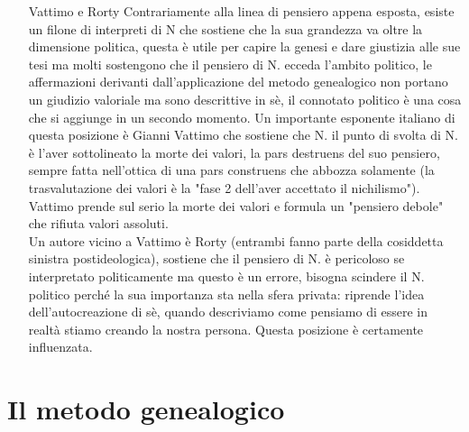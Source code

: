 \documentclass[10pt,a4paper]{article}
\begin{document}
\begin{itemize}
\item[Vattimo e Rorty] Contrariamente alla linea di pensiero appena esposta, esiste un filone di interpreti di N che sostiene che la sua grandezza va oltre la dimensione politica, questa è utile per capire la genesi e dare giustizia alle sue tesi ma molti sostengono che il pensiero di N. ecceda l'ambito politico, le affermazioni derivanti dall'applicazione del metodo genealogico non portano un giudizio valoriale ma sono descrittive in sè, il connotato politico è una cosa che si aggiunge in un secondo momento. Un importante esponente italiano di questa posizione è Gianni Vattimo che sostiene che N. il punto di svolta di N. è l'aver sottolineato la morte dei valori, la pars destruens del suo pensiero, sempre fatta nell'ottica di una pars construens che abbozza solamente  (la trasvalutazione dei valori è la "fase 2 dell'aver accettato il nichilismo"). Vattimo prende sul serio la morte dei valori e formula un "pensiero debole" che rifiuta valori assoluti.\\
Un autore vicino a Vattimo è Rorty (entrambi fanno parte della cosiddetta sinistra postideologica), sostiene che il pensiero di N. è pericoloso se interpretato politicamente ma questo è un errore, bisogna scindere il N. politico perché la sua importanza sta nella sfera privata: riprende l'idea dell'autocreazione di sè, quando descriviamo come pensiamo di essere in realtà stiamo creando la nostra persona. Questa posizione è certamente influenzata.
\end{itemize}
\section{Il metodo genealogico}
\end{document}
